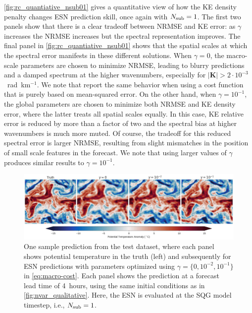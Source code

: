 \cref{fig:rc_quantiative_nsub01} gives a quantitative view of how the KE density
penalty changes ESN prediction skill, once again with $N_\text{sub}=1$.
The first two panels show that there is a clear tradeoff between NRMSE and KE error:
as $\gamma$ increases the NRMSE increases but the spectral representation improves.
The final panel in \cref{fig:rc_quantiative_nsub01}
shows that the spatial scales at which the spectral error manifests in these
different solutions.
When $\gamma=0$, the macro-scale parameters are chosen to minimize NRMSE, leading to blurry predictions and a damped spectrum at the higher wavenumbers,
especially for $|\mathbf{K}| > 2\cdot10^{-3}$~rad~km$^{-1}$.
We note that \citet{lam_graphcast_2022} report the same behavior when using a cost function that is purely based on mean-squared error.
On the other hand, when $\gamma = 10^{-1}$, the global parameters are chosen to
minimize both NRMSE and KE density error, where the latter treats all spatial
scales equally.
In this case, KE relative error is reduced by more than a factor of two and the
spectral bias at higher wavenumbers is much more muted.
Of course, the tradeoff for this reduced spectral error is larger NRMSE, resulting
from slight mismatches in the position of small scale features in the forecast.
We note that using larger values of $\gamma$ produces similar results to
$\gamma=10^{-1}$.


\begin{figure}
    \centering
    \includegraphics[width=\textwidth]{../figures/rc_qualitative_gamma.jpg}
    \caption{
        One sample prediction from the test dataset, where each panel shows
        potential temperature in the truth (left) and subsequently for
        ESN predictions with parameters optimized using
        $\gamma=\{0, 10^{-2}, 10^{-1}\}$ in \cref{eq:macro-cost}.
        Each panel shows the prediction at a forecast lead time of 4~hours,
        using the same initial conditions as in \cref{fig:nvar_qualitative}.
        Here, the ESN is evaluated at the SQG model timestep, i.e., $N_\text{sub}=1$.
    }
    \label{fig:rc_qualitative_nsub01}
\end{figure}

